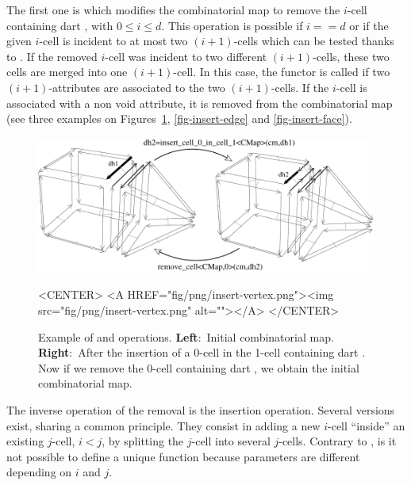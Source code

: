 The first one is  which modifies the
combinatorial map to remove the $i$-cell containing dart ,
with $0 \leq i \leq d$. This operation is possible if $i==d$ or if the given
$i$-cell is incident to at most two $(i+1)$-cells which can be tested
thanks to .  If the removed $i$-cell
was incident to two different $(i+1)$-cells, these two cells are
merged into one $(i+1)$-cell. In this case, the  functor
is called if two $(i+1)$-attributes are associated to the two
$(i+1)$-cells.  If the $i$-cell is associated with a non void
attribute, it is removed from the combinatorial map  (see three
examples on Figures~\ref{fig-insert-vertex}, \ref{fig-insert-edge} and
\ref{fig-insert-face}).
\begin{figure}[htb]
  \begin{ccTexOnly}
    \begin{center}
      \includegraphics[width=.75\textwidth]{Combinatorial_map/fig/pdf/insert-vertex}
    \end{center}
  \end{ccTexOnly}
  \begin{ccHtmlOnly}
    <CENTER> <A HREF="fig/png/insert-vertex.png"><img
    src="fig/png/insert-vertex.png" alt=""></A> </CENTER>
  \end{ccHtmlOnly}
  \caption{Example of  and
     operations. \textbf{Left}:~Initial
    combinatorial map.  \textbf{Right}:~After the insertion of a
    0-cell in the 1-cell containing dart .  Now if we remove
    the 0-cell containing dart , we obtain the initial
    combinatorial map.}
  \label{fig-insert-vertex}
\end{figure}

The inverse operation of the removal is the insertion operation.
Several versions exist, sharing a common principle. They consist in
adding a new $i$-cell ``inside'' an existing $j$-cell, $i<j$, by
splitting the $j$-cell into several $j$-cells.  Contrary to
, is it not possible to define a unique
 function because parameters
are different depending on $i$ and $j$.

